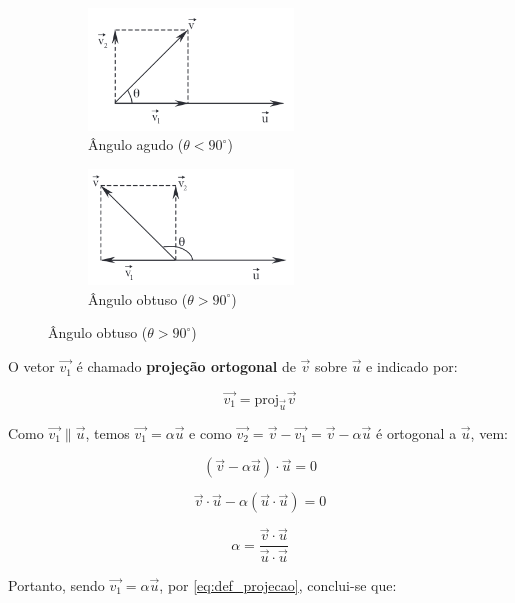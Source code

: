 \begin{figure}[H]
  \centering
  \begin{subfigure}{0.45\textwidth}
    \centering
    \includegraphics[width=0.6\textwidth]{./fig/fig2.10a.png}
    \caption{Ângulo agudo ($\theta < 90^\circ$)}
    \label{fig:fig2.10a}
  \end{subfigure}
  \centering
  \begin{subfigure}{0.45\textwidth}
    \centering
    \includegraphics[width=0.6\textwidth]{./fig/fig2.10b.png}
    \caption{Ângulo obtuso ($\theta > 90^\circ$)}
    \label{fig:fig2.10b}
  \end{subfigure}
\end{figure}

O vetor $\vec{v_1}$ é chamado \textbf{projeção ortogonal} de $\vec{v}$ sobre
$\vec{u}$ e indicado por:

\begin{equation}
  \vec{v_1} = \text{proj}_{\vec{u}} \vec{v}
  \label{eq:def_projecao}
\end{equation}

Como $\vec{v_1} \parallel \vec{u}$, temos $\vec{v_1} = \alpha \vec{u}$ e como
$\vec{v_2} = \vec{v} - \vec{v_1} = \vec{v} - \alpha \vec{u}$ é ortogonal a
$\vec{u}$, vem:

\[
(\vec{v} - \alpha \vec{u}) \cdot \vec{u} = 0
\]

\[
\vec{v} \cdot \vec{u} - \alpha (\vec{u} \cdot \vec{u}) = 0
\]

\[
\alpha = \frac{\vec{v} \cdot \vec{u}}{\vec{u} \cdot \vec{u}}
\]

Portanto, sendo $\vec{v_1} = \alpha \vec{u}$, por \eqref{eq:def_projecao},
conclui-se que:

